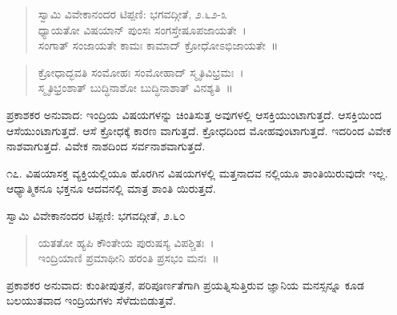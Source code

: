\begin{verse}
ಸ್ವಾಮಿ ವಿವೇಕಾನಂದರ ಟಿಪ್ಪಣಿ: ಭಗವದ್ಗೀತೆ, ೨.೬೨-೩\\ಧ್ಯಾಯತೋ ವಿಷಯಾನ್ ಪುಂಸಃ ಸಂಗಸ್ತೇಷೂಪಜಾಯತೇ~।\\ಸಂಗಾತ್ ಸಂಜಾಯತೇ ಕಾಮಃ ಕಾಮಾದ್ ಕ್ರೋಧೋಽಭಿಜಾಯತೇ~॥
\end{verse}

\begin{verse}
ಕ್ರೋಧಾದ್ಭವತಿ ಸಂಮೋಹಃ ಸಂಮೋಹಾದ್ ಸ್ಮೃತಿವಿಭ್ರಮಃ~।\\ಸ್ಮೃತಿಭ್ರಂಶಾತ್ ಬುದ್ಧಿನಾಶೋ ಬುದ್ಧಿನಾಶಾತ್ ವಿನಶ್ಯತಿ~॥
\end{verse}

ಪ್ರಕಾಶಕರ ಅನುವಾದ: ಇಂದ್ರಿಯ ವಿಷಯಗಳನ್ನು ಚಿಂತಿಸುತ್ತ ಅವುಗಳಲ್ಲಿ ಆಸಕ್ತಿಯುಂಟಾಗುತ್ತದೆ. ಆಸಕ್ತಿಯಿಂದ ಆಸೆಯುಂಟಾಗುತ್ತದೆ. ಆಸೆ ಕ್ರೋಧಕ್ಕೆ ಕಾರಣ ವಾಗುತ್ತದೆ. ಕ್ರೋಧದಿಂದ ಮೋಹವುಂಟಾಗುತ್ತದೆ. ಇದರಿಂದ ವಿವೇಕ ನಾಶವಾಗುತ್ತದೆ. ವಿವೇಕ ನಾಶದಿಂದ ಸರ್ವನಾಶವಾಗುತ್ತದೆ.

೧೭. ವಿಷಯಾಸಕ್ತ ವ್ಯಕ್ತಿಯಲ್ಲಿಯೂ ಹೊರಗಿನ ವಿಷಯಗಳಲ್ಲಿ ಮತ್ತನಾದವ ನಲ್ಲಿಯೂ ಶಾಂತಿಯಿರುವುದೇ ಇಲ್ಲ. ಆಧ್ಯಾತ್ಮಿಕನೂ ಭಕ್ತನೂ ಆದವನಲ್ಲಿ ಮಾತ್ರ ಶಾಂತಿ ಯಿರುತ್ತದೆ. 

\begin{myquote}
ಸ್ವಾಮಿ ವಿವೇಕಾನಂದರ ಟಿಪ್ಪಣಿ: ಭಗವದ್ಗೀತೆ, ೨.೬೦
\end{myquote}

\begin{verse}
ಯತತೋ ಹ್ಯಪಿ ಕೌಂತೇಯ ಪುರುಷಸ್ಯ ವಿಪಶ್ಚಿತಃ~।\\ಇಂದ್ರಿಯಾಣಿ ಪ್ರಮಾಥೀನಿ ಹರಂತಿ ಪ್ರಸಭಂ ಮನಃ~॥
\end{verse}

ಪ್ರಕಾಶಕರ ಅನುವಾದ: ಕುಂತೀಪುತ್ರನೆ, ಪರಿಪೂರ್ಣತೆಗಾಗಿ ಪ್ರಯತ್ನಿಸುತ್ತಿರುವ ಜ್ಞಾನಿಯ ಮನಸ್ಸನ್ನೂ ಕೂಡ ಬಲಯುತವಾದ ಇಂದ್ರಿಯಗಳು ಸೆಳೆದುಬಿಡುತ್ತವೆ.

